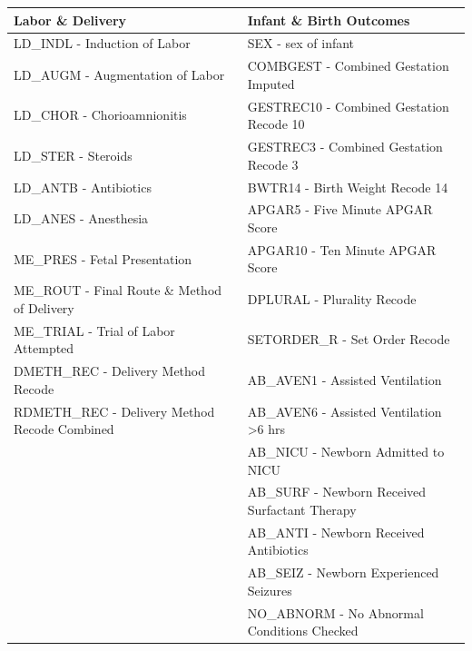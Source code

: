 \documentclass[a4paper,12pt]{article} %
\begin{document}
\begin{table}[H]
\centering
\small
\begin{tabular}{|>{\columncolor{labor}}l|>{\columncolor{infant}}l|}
\hline
\textbf{Labor \& Delivery} & \textbf{Infant \& Birth Outcomes} \\
\hline
LD\_INDL -  Induction of Labor& SEX -  sex of infant\\
LD\_AUGM -  Augmentation of Labor& COMBGEST -  Combined Gestation Imputed\\
LD\_CHOR -  Chorioamnionitis& GESTREC10 -  Combined Gestation Recode 10\\
LD\_STER -  Steroids& GESTREC3 -  Combined Gestation Recode 3\\
LD\_ANTB -  Antibiotics& BWTR14 -  Birth Weight Recode 14\\
LD\_ANES -  Anesthesia& APGAR5 -  Five Minute APGAR Score\\
ME\_PRES -  Fetal Presentation& APGAR10 -  Ten Minute APGAR Score\\
ME\_ROUT -  Final Route \& Method of Delivery& DPLURAL -  Plurality Recode\\
ME\_TRIAL -  Trial of Labor Attempted& SETORDER\_R -  Set Order Recode\\
DMETH\_REC -  Delivery Method Recode& AB\_AVEN1 -  Assisted Ventilation\\
RDMETH\_REC -  Delivery Method Recode Combined& AB\_AVEN6 -  Assisted Ventilation \textgreater  6 hrs\\
 & AB\_NICU -  Newborn Admitted to NICU\\
 & AB\_SURF -  Newborn Received Surfactant Therapy\\
 & AB\_ANTI -  Newborn Received Antibiotics\\
 & AB\_SEIZ -  Newborn Experienced Seizures\\
 & NO\_ABNORM -  No Abnormal Conditions Checked\\
\hline
\end{tabular}
\end{table}
\end{document}
